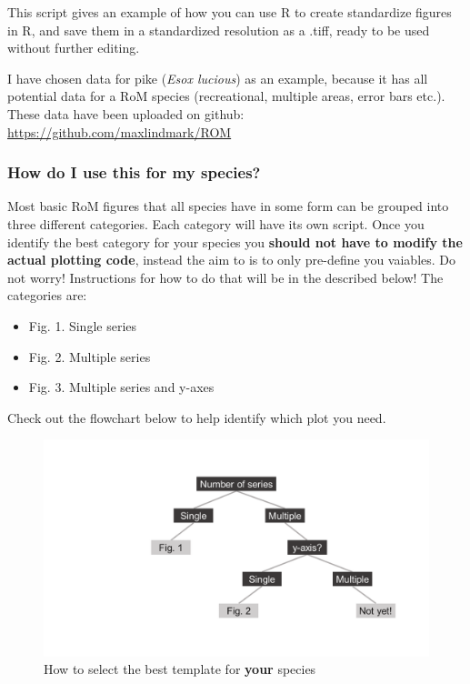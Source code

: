 \documentclass[]{article}
\providecommand{\tightlist}{%
  \setlength{\itemsep}{0pt}\setlength{\parskip}{0pt}}
\begin{document}
This script gives an example of how you can use R to create standardize
figures in R, and save them in a standardized resolution as a .tiff,
ready to be used without further editing.

I have chosen data for pike (\emph{Esox lucious}) as an example, because
it has all potential data for a RoM species (recreational, multiple
areas, error bars etc.). These data have been uploaded on github:
\url{https://github.com/maxlindmark/ROM}

\subsubsection{How do I use this for my
species?}\label{how-do-i-use-this-for-my-species}

Most basic RoM figures that all species have in some form can be grouped
into three different categories. Each category will have its own script.
Once you identify the best category for your species you \textbf{should
not have to modify the actual plotting code}, instead the aim to is to
only pre-define you vaiables. Do not worry! Instructions for how to do
that will be in the described below! The categories are:

\begin{itemize}
\tightlist
\item
  Fig. 1. Single series
\item
  Fig. 2. Multiple series
\item
  Fig. 3. Multiple series and y-axes
\end{itemize}

Check out the flowchart below to help identify which plot you need.

\begin{figure}
\centering
\includegraphics{Flow_chart.png}
\caption{How to select the best template for \textbf{your} species}
\end{figure}
\end{document}
